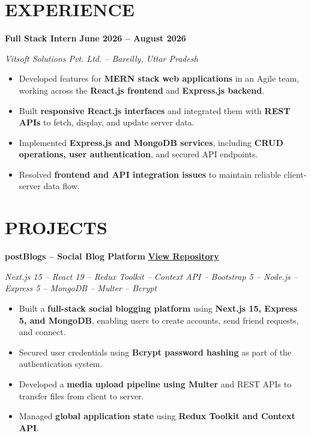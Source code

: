 \documentclass[10pt,a4paper]{article}
\begin{document}
\section{EXPERIENCE}

\textbf{Full Stack Intern}
\hfillo
\textbf{June 2026 -- August 2026}

\textit{Vitsoft Solutions Pvt. Ltd. -- Bareilly, Uttar Pradesh}

\begin{itemize}
    \item Developed features for \textbf{MERN stack web applications}
    in an Agile team, working across the \textbf{React.js frontend}
    and \textbf{Express.js backend}.

    \item Built \textbf{responsive React.js interfaces} and integrated
    them with \textbf{REST APIs} to fetch, display, and update server data.

    \item Implemented \textbf{Express.js and MongoDB services},
    including \textbf{CRUD operations, user authentication},
    and secured API endpoints.

    \item Resolved \textbf{frontend and API integration issues}
    to maintain reliable client-server data flow.
\end{itemize}

\section{PROJECTS}

\textbf{postBlogs -- Social Blog Platform}
\hfill
\href{https://github.com/Amjadkhan9756/postBlogs}
{\textbf{View Repository}}

\textit{Next.js 15 -- React 19 -- Redux Toolkit -- Context API --
Bootstrap 5 -- Node.js -- Express 5 -- MongoDB -- Multer -- Bcrypt}

\begin{itemize}
    \item Built a \textbf{full-stack social blogging platform}
    using \textbf{Next.js 15, Express 5, and MongoDB}, enabling users
    to create accounts, send friend requests, and connect.

    \item Secured user credentials using \textbf{Bcrypt password hashing}
    as part of the authentication system.

    \item Developed a \textbf{media upload pipeline using Multer}
    and REST APIs to transfer files from client to server.

    \item Managed \textbf{global application state} using
    \textbf{Redux Toolkit and Context API}.
\end{itemize}
\end{document}
